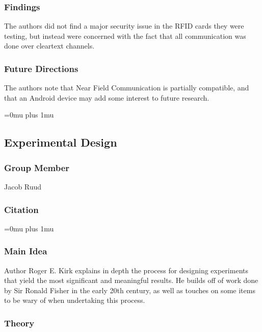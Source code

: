 \subsubsection{Findings}

\noindent
The authors did not find a major security issue in the RFID cards they were testing, but instead were concerned with the fact that all communication was done over cleartext channels.  

\subsubsection{Future Directions}

\noindent
The authors note that Near Field Communication is partially compatible, and that an Android device may add some interest to future research. 

\Urlmuskip=0mu plus 1mu\relax

\noindent
\subsection{{Experimental} {Design}}

\subsubsection{Group Member}

\noindent
Jacob Ruud

\noindent
\subsubsection{Citation}

\Urlmuskip=0mu plus 1mu\relax

\subsubsection{Main Idea}

\noindent
Author Roger E. Kirk explains in depth the process for designing experiments that yield the most significant and meaningful results. He builds off of work done by Sir Ronald Fisher in the early 20th century, as well as touches on some items to be wary of when undertaking this process.

\subsubsection{Theory}

